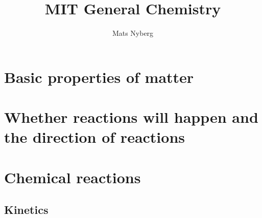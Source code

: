 \documentclass[
  fontsize=9.5pt,
  twoside,
  open=right,
  mpinclude=true,
  numbers=noenddot,
  DIV=9
]{scrbook}
\begin{document}


\title{MIT General Chemistry}
\author{Mats Nyberg}
\maketitle

\frontmatter

\tableofcontents
\clearpage

\mainmatter

\part{Basic properties of matter}





\part{Whether reactions will happen and the direction of reactions}




\part{Chemical reactions}





\chapter{Kinetics}


\backmatter


\printbibliography
\end{document}
